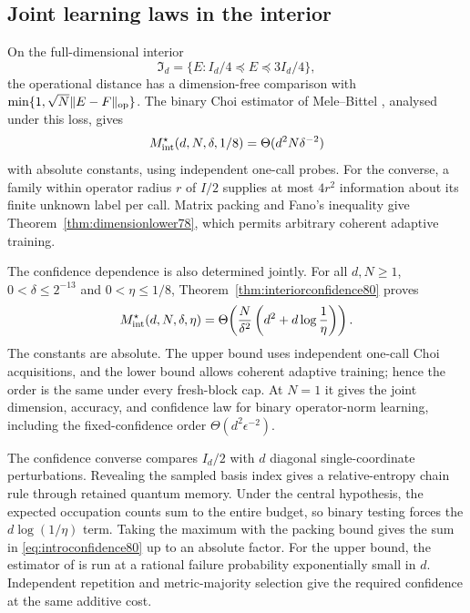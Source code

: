 \subsection{Joint learning laws in the interior}
On the full-dimensional interior
\[
 \mathfrak I_d=\{E:I_d/4\preceq E\preceq3I_d/4\},
\]
the operational distance has a dimension-free comparison with
$\min\{1,\sqrt N\|E-F\|_{\rm op}\}$.  The binary Choi estimator
of Mele--Bittel \cite{MB67}, analysed under this loss, gives
\begin{equation}\label{eq:introinterior78}
 M_{\rm int}^\star(d,N,\delta,1/8)
 =\Theta(d^2N\delta^{-2})
\end{equation}
with absolute constants, using independent one-call probes.  For
the converse, a family within operator radius $r$ of $I/2$
supplies at most $4r^2$ information about its finite unknown label
per call.  Matrix packing and Fano's inequality give
Theorem~\ref{thm:dimensionlower78}, which permits arbitrary coherent
adaptive training.

The confidence dependence is also determined jointly.  For all
$d,N\ge1$, $0<\delta\le2^{-13}$ and $0<\eta\le1/8$,
Theorem~\ref{thm:interiorconfidence80} proves
\begin{equation}\label{eq:introconfidence80}
 M_{\rm int}^{\star}(d,N,\delta,\eta)
 =\Theta\!\left(\frac{N}{\delta^2}
                   \left(d^2+d\log\frac1\eta\right)\right).
\end{equation}
The constants are absolute.  The upper bound uses independent
one-call Choi acquisitions, and the lower bound allows coherent
adaptive training; hence the order is the same under every
fresh-block cap.  At $N=1$ it gives the joint dimension, accuracy,
and confidence law for binary operator-norm learning, including
the fixed-confidence order $\Theta(d^2\epsilon^{-2})$.

The confidence converse compares $I_d/2$ with $d$ diagonal
single-coordinate perturbations.  Revealing the sampled basis
index gives a relative-entropy chain rule through retained quantum
memory.  Under the central hypothesis, the expected occupation
counts sum to the entire budget, so binary testing forces the
$d\log(1/\eta)$ term.  Taking the maximum with the packing
bound gives the sum in \eqref{eq:introconfidence80} up to an
absolute factor.  For the upper bound, the estimator of
\cite[Corollary~III.9]{MB67} is run at a rational failure
probability exponentially small in $d$.  Independent repetition
and metric-majority selection give the required confidence at the
same additive cost.

